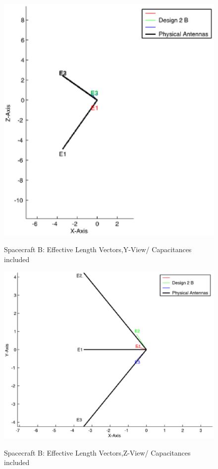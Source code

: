 \documentclass[a4paper,14pt]{extbook}
\begin{document}
\begin{figure}
 \begin{center}
 \includegraphics[width=12cm]{HeffD2HGA0-500kHz-YViewCap_B.eps}\\
    \caption{Spacecraft B: Effective Length Vectors,Y-View/ Capacitances included}\label{fig_Heff_D2_B_Y_ViewCap}\end{center}
\end{figure}

\begin{figure}
        \begin{center}
        \includegraphics[width=12cm]{HeffD2HGA0-500kHz-ZViewCap_B.eps}\\
        \caption{Spacecraft B: Effective Length Vectors,Z-View/ Capacitances included}\label{fig_Heff_D2_B_Z_ViewCap}
    \end{center}
\end{figure}
\end{document}
